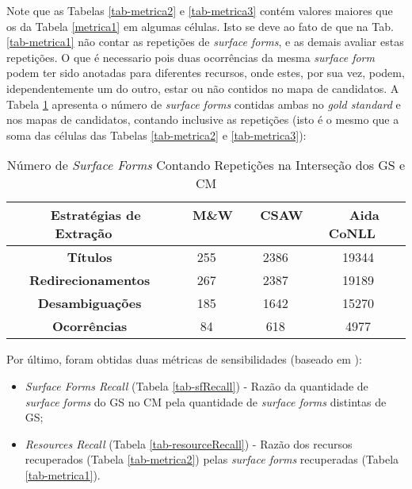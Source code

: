 \documentclass[10pt,a4paper]{llncs}
\begin{document}
{Note que as Tabelas \ref{tab-metrica2} e \ref{tab-metrica3} contém valores maiores que os da Tabela \ref{metrica1} em algumas células. Isto se deve ao fato de que na Tab. \ref{tab-metrica1} não contar as repetições de \textit{surface forms}, e as demais avaliar estas repetições. O que é necessario pois duas ocorrências da mesma \textit{surface form} podem ter sido anotadas para diferentes recursos, onde estes, por sua vez, podem, idependentemente um do outro, estar ou não contidos no mapa de candidatos. A Tabela \ref{tab-sum-metrica2e3} apresenta o número de \textit{surface forms} contidas ambas no \textit{gold standard} e nos mapas de candidatos, contando inclusive as repetições (isto é o mesmo que a soma das células das Tabelas \ref{tab-metrica2} e \ref{tab-metrica3}):
\begin{table} \label{tab-sum-metrica2e3}
\caption{Número de \textit{Surface Forms} Contando Repetições na Interseção dos GS e CM}
\centering
    \begin{tabular}{|c|c|c|c|}
    \hline
    ~ {\bf Estratégias de Extração} ~ 	& ~ {\bf M\&W} ~ 	& ~ {\bf CSAW} ~ 	& ~ {\bf Aida CoNLL} ~\\ \hline  
    {\bf Títulos} 			& 255			& 2386			& 19344 \\ \hline
    {\bf Redirecionamentos} 		& 267			& 2387			& 19189 \\ \hline
    {\bf Desambiguações} 		& 185			& 1642			& 15270 \\ \hline
    {\bf Ocorrências} 			& 84			& 618			& 4977 \\ \hline
    \end{tabular}
\end{table}

Por último, foram obtidas duas métricas de sensibilidades (baseado em \cite{citet-Hachey2012}):
\begin{itemize}
 \item \textit{Surface Forms Recall} (Tabela \ref{tab-sfRecall}) - Razão da quantidade de \textit{surface forms} do GS no CM pela quantidade de \textit{surface forms} distintas de GS;
 \item \textit{Resources Recall} (Tabela \ref{tab-resourceRecall}) - Razão dos recursos recuperados (Tabela \ref{tab-metrica2}) pelas \textit{surface forms} recuperadas (Tabela \ref{tab-metrica1}).
\end{itemize}

}
\end{document}
